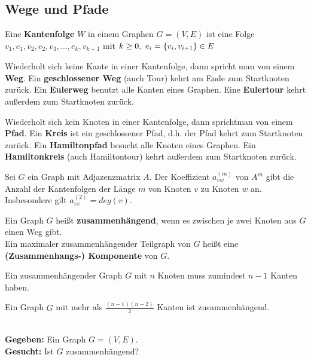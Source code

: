 	\subsection{Wege und Pfade}
	\begin{definition*}[Kantenfolge]
		Eine \textbf{Kantenfolge} $W$ in einem Graphen $G = (V, E)$ ist eine Folge $v_1, e_1, v_2, e_2, v_3, ..., e_k, v_{k+1}$ mit $k \ge 0,~e_i = \{v_i, v_{i+1}\} \in E$
	\end{definition*}
	\begin{definition*}[Weg]
		Wiederholt sich keine Kante in einer Kantenfolge, dann spricht man von einem \textbf{Weg}. Ein \textbf{geschlossener Weg} (auch Tour) kehrt am Ende zum Startknoten zurück. Ein \textbf{Eulerweg} benutzt alle Kanten eines Graphen. Eine \textbf{Eulertour} kehrt außerdem zum Startknoten zurück.
	\end{definition*}
	\begin{definition*}[Pfad]
		Wiederholt sich kein Knoten in einer Kantenfolge, dann sprichtman von einem \textbf{Pfad}. Ein \textbf{Kreis} ist ein geschlossener Pfad, d.h. der Pfad kehrt zum Startknoten zurück. Ein \textbf{Hamiltonpfad} besucht alle Knoten eines Graphen. Ein \textbf{Hamiltonkreis} (auch Hamiltontour) kehrt außerdem zum Startknoten zurück.
	\end{definition*}
	\begin{satz}
		Sei $G$ ein Graph mit Adjazenzmatrix $A$. Der Koeffizient $a_{vw}^{(m)}$ von $A^m$ gibt die Anzahl der Kantenfolgen der Länge $m$ von Knoten $v$ zu Knoten $w$ an. Insbesondere gilt $a_{vv}^{(2)} = deg(v)$.
	\end{satz}
	\begin{definition*}[Zusammenhängend]
		Ein Graph $G$ heißt \textbf{zusammenhängend}, wenn es zwischen je zwei Knoten aus $G$ einen Weg gibt.\\[5pt]
		Ein maximaler zusammenhängender Teilgraph von $G$ heißt eine \textbf{(Zusammenhangs-) Komponente} von $G$.
	\end{definition*}
	\begin{satz}
		Ein zusammenhängender Graph $G$ mit $n$ Knoten muss zumindest $n - 1$ Kanten haben.
	\end{satz}
	\begin{satz}
		Ein Graph $G$ mit mehr als $\frac{(n-1)(n-2)}{2}$ Kanten ist zusammenhängend.
	\end{satz}
	\begin{problem}[Zusammenhang]~\\[5pt]
		\hspace*{10pt}\textbf{Gegeben: } Ein Graph $G = (V, E)$.\\[5pt]
		\hspace*{10pt}\textbf{Gesucht: } Ist $G$ zusammenhängend?
	\end{problem}
